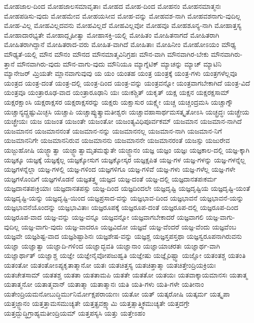 {ಮೋಹಜಾಲ-ದಿಂದ
ಮೋಹಜಾಲಸಮಾವೃತಾಃ
ಮೋಹದ
ಮೋಹ-ದಿಂದ
ಮೋಹನಂ
ಮೋಹನಮಾತ್ಮನಃ
ಮೋಹಪಡಿಸು-ವುದು
ಮೋಹಮೇವ
ಮೋಹಯಸೀವ
ಮೋಹ-ವನ್ನು
ಮೋಹವಶ-ನಾಗಿ
ಮೋಹವಶನಾಗು-ವುದಿಲ್ಲ
ಮೋಹ-ವಿಲ್ಲ
ಮೋಹವಿಲ್ಲದವನು
ಮೋಹವಿಲ್ಲದೆ
ಮೋಹವಿಲ್ಲವೋ
ಮೋಹವೂ
ಮೋಹಶೂನ್ಯ-ನಾಗಿ
ಮೋಹಾತ್ತಸ್ಯ
ಮೋಹಾದಾರಭ್ಯತೇ
ಮೋಹಾದ್ಗೃಹೀತ್ವಾ
ಮೋಹಾಸಕ್ತಿ-ಯಲ್ಲಿ
ಮೋಹಿತಂ
ಮೋಹಿತನಾಗದೆ
ಮೋಹಿತರಾಗಿ
ಮೋಹಿತರಾಗಿದ್ದಾನೆ
ಮೋಹಿತರಾದ-ವರು
ಮೋಹಿತ-ವಾಗಿದೆ
ಮೋಹಿತಾಃ
ಮೋಹಿನೀಂ
ಮೋಹೋಽಯಂ
ಮೌಢ್ಯ
ಮೌಢ್ಯತೆ-ಯಲ್ಲಿ
ಮೌನ
ಮೌನಂ
ಮೌನದ
ಮೌನಮಾತ್ಮವಿನಿಗ್ರಹಃ
ಮೌನ-ವಾಗಿ
ಮೌನವಾಗಿರ-ಬೇಕು
ಮೌನವಾಗಿರು-ತ್ತಾನೆ
ಮೌನವಾಗಿರು-ವುದು
ಮೌನ-ವಾಗು-ವುದು
ಮೌನಿಯೂ
ಮ್ಯಾಗ್ನೆಟಿಕ್
ಮ್ಯಾಚನ್ನು
ಮ್ಯಾಚ್
ಮ್ಯಾಟಿನಿ
ಮ್ಯಾನೇಜರ್
ಮ್ರಿಯತೇ
ಮ್ಲಾನವಾಗುವುವು
ಯ
ಯಂ
ಯಂತಹ
ಯಂತ್ರ
ಯಂತ್ರಕ್ಕೆ
ಯಂತ್ರ-ಗಳು
ಯಂತ್ರಗಳೆಲ್ಲವೂ
ಯಂತ್ರದ
ಯಂತ್ರ-ದಂತೆ
ಯಂತ್ರ-ದಲ್ಲಿ
ಯಂತ್ರ-ದಿಂದ
ಯಂತ್ರ-ವನ್ನು
ಯಂತ್ರವನ್ನೋ
ಯಂತ್ರವಾಗಬೇಕಾಗಿದೆ
ಯಂತ್ರ-ವಿದೆ
ಯಂತ್ರವೂ
ಯಂತ್ರಾರೂಢ-ವಾದ
ಯಂತ್ರಾರೂಢಾನಿ
ಯಃ
ಯಃಕಶ್ಚಿತ್
ಯಕೃತ್
ಯಕ್ಷ
ಯಕ್ಷನ
ಯಕ್ಷರಕ್ಷಸಾಮ್
ಯಕ್ಷರಕ್ಷಾಂಸಿ
ಯಕ್ಷರಾಕ್ಷಸರ
ಯಕ್ಷರಾಕ್ಷಸರನ್ನು
ಯಕ್ಷರು
ಯಕ್ಷಾಸುರ
ಯಕ್ಷ್ಯೇ
ಯಚ್ಚ
ಯಚ್ಚಂದ್ರಮಸಿ
ಯಚ್ಚಾಗ್ನೌ
ಯಚ್ಚಾನ್ಯದ್ದ್ರಷ್ಟುಮಿಚ್ಛಸಿ
ಯಚ್ಚಾಪಿ
ಯಚ್ಚಾಪ್ಯುತ್ಕ್ರಾಮತೀಶ್ವರಃ
ಯಚ್ಚಾವಹಾಸಾರ್ಥಮಸತ್ಕೃತೋಽಸಿ
ಯಚ್ಛ್ರದ್ಧಃ
ಯಚ್ಛ್ರೇಯ
ಯಚ್ಛ್ರೇಯಃ
ಯಜ
ಯಜಂತ
ಯಜಂತೇ
ಯಜಂತೋ
ಯಜಂತ್ಯವಿಧಿಪೂರ್ವಕಮ್
ಯಜಮಾನ
ಯಜಮಾನ-ನಾಗಿದೆ
ಯಜಮಾನನ
ಯಜಮಾನನಂತೆ
ಯಜಮಾನ-ನನ್ನು
ಯಜಮಾನನಲ್ಲ
ಯಜಮಾನ-ನಾಗಿ
ಯಜಮಾನ-ನಿಗೆ
ಯಜಮಾನನಿಗೇ
ಯಜಮಾನನಿರುವ
ಯಜಮಾನನು
ಯಜಮಾನನೇ
ಯಜಮಾನರಂತೆ
ಯಜಸ್ಸು
ಯಜುರೇವ
ಯಜ್ಜುಹೋಷಿ
ಯಜ್ಜ್ಞಾತ್ವಾ
ಯಜ್ಜ್ಞಾತ್ವಾಮೃತಮಶ್ನುತೇ
ಯಜ್ಜ್ಞಾನಂ
ಯಜ್ಞ
ಯಜ್ಞಂ
ಯಜ್ಞಃ
ಯಜ್ಞಕಾಲ-ದಲ್ಲಿ
ಯಜ್ಞ-ಕ್ಕಾಗಿ
ಯಜ್ಞಕ್ಕೂ
ಯಜ್ಞಕ್ಕೆ
ಯಜ್ಞಕ್ಕೆಲ್ಲ
ಯಜ್ಞಕ್ಕೋಸುಗ
ಯಜ್ಞಕ್ಕೋಸ್ಕರ
ಯಜ್ಞಕ್ಷಪಿತ
ಯಜ್ಞ-ಗಳ
ಯಜ್ಞ-ಗಳನ್ನು
ಯಜ್ಞ-ಗಳನ್ನೆಲ್ಲ
ಯಜ್ಞಗಳನ್ನೆಲ್ಲಾ
ಯಜ್ಞ-ಗಳಲ್ಲಿ
ಯಜ್ಞ-ಗಳಿಂದ
ಯಜ್ಞಗಳಿಗೂ
ಯಜ್ಞ-ಗಳಿವೆ
ಯಜ್ಞ-ಗಳು
ಯಜ್ಞ-ಗಳೆಲ್ಲ
ಯಜ್ಞ-ಗಳೇ
ಯಜ್ಞಗಳೊಂದಿಗೆ
ಯಜ್ಞಗಳೊಡನೆ
ಯಜ್ಞತತ್ತ್ವ
ಯಜ್ಞದ
ಯಜ್ಞ-ದಂತೆ
ಯಜ್ಞ-ದಲ್ಲಿ
ಯಜ್ಞದಾನತಪಃಕರ್ಮ
ಯಜ್ಞದಾನತಪಃಕ್ರಿಯಾಃ
ಯಜ್ಞದಾನತಪಸ್ಸು
ಯಜ್ಞ-ದಿಂದ
ಯಜ್ಞದಿಂದಲೇ
ಯಜ್ಞದೃಷ್ಟಿ
ಯಜ್ಞದೃಷ್ಟಿಯ
ಯಜ್ಞದೃಷ್ಟಿ-ಯಂತೆ
ಯಜ್ಞದೃಷ್ಟಿ-ಯನ್ನು
ಯಜ್ಞದೃಷ್ಟಿ-ಯಿಂದ
ಯಜ್ಞಪ್ರಸಾದ-ವನ್ನು
ಯಜ್ಞಭಾವ-ದಿಂದ
ಯಜ್ಞಭಾವನೆ
ಯಜ್ಞಭಾವನೆ-ಯನ್ನು
ಯಜ್ಞಭಾವನೆಯೊಂದನ್ನು
ಯಜ್ಞಭಾವಿತಾಃ
ಯಜ್ಞರೂಪಕ್ಕೆ
ಯಜ್ಞರೂಪ-ದಂತೆ
ಯಜ್ಞರೂಪ-ದಲ್ಲಿ
ಯಜ್ಞರೂಪ-ದಿಂದ
ಯಜ್ಞರೂಪ-ವಾದ
ಯಜ್ಞ-ವನ್ನು
ಯಜ್ಞ-ವನ್ನೂ
ಯಜ್ಞವನ್ನೋ
ಯಜ್ಞವಾಗಬೇಕಾದರೆ
ಯಜ್ಞವಾಗಲಿ
ಯಜ್ಞ-ವಾಗು-ವುದಿಲ್ಲ
ಯಜ್ಞ-ವಾಗು-ವುದು
ಯಜ್ಞ-ವಾದರೂ
ಯಜ್ಞವಿದೋ
ಯಜ್ಞವೆ
ಯಜ್ಞ-ವೆಂದರೆ
ಯಜ್ಞ-ವೆಂದು
ಯಜ್ಞವೆಂಬ
ಯಜ್ಞವೇ
ಯಜ್ಞಶಿಷ್ಟ-ವಾದ
ಯಜ್ಞಶಿಷ್ಟಾಶಿನಃ
ಯಜ್ಞಶೇಷ-ವನ್ನು
ಯಜ್ಞಶ್ಚ
ಯಜ್ಞಸ್ತಪಸ್ತಥಾ
ಯಜ್ಞಸ್ವರೂಪನಾಗಿರುವನು
ಯಜ್ಞಾ
ಯಜ್ಞಾತ್ವಾ
ಯಜ್ಞಾದಿ-ಗಳಿಂದ
ಯಜ್ಞಾದ್ಭವತಿ
ಯಜ್ಞಾನಾಂ
ಯಜ್ಞಾಯಾಚರತಃ
ಯಜ್ಞಾರ್ಥ-ವಾಗಿ
ಯಜ್ಞಾರ್ಥಾತ್
ಯಜ್ಞಾಶ್ಚ
ಯಜ್ಞೇ
ಯಜ್ಞೇನೈವೋಪಜುಹ್ವತಿ
ಯಜ್ಞೇಷು
ಯಜ್ಞೈರಿಷ್ಟ್ವಾ
ಯಜ್ಞೋ
ಯತಂತಶ್ಚ
ಯತಂತಿ
ಯತಂತೋ
ಯತಂತೋಽಪ್ಯಕೃತಾತ್ಮಾನೋ
ಯತಃ
ಯತಚಿತ್ತಸ್ಯ
ಯತಚಿತ್ತಾತ್ಮಾ
ಯತಚಿತ್ತೇಂದ್ರಿಯಕ್ರಿಯಃ
ಯತಚೇತಸಾಮ್
ಯತತಶ್ಚ
ಯತತಾ
ಯತತಾಮಪಿ
ಯತತೇ
ಯತತೋ
ಯತಯಃ
ಯತವಾಕ್ಕಾಯಮಾನಸಃ
ಯತಾತ್ಮ
ಯತಾತ್ಮನೋ
ಯತಾತ್ಮವಾನ್
ಯತಾತ್ಮಾ
ಯತಾತ್ಮಾನಃ
ಯತಿ
ಯತಿ-ಗಳು
ಯತಿ-ಗಳೇ
ಯತೀನಾಂ
ಯತೇಂದ್ರಿಯಮನೋಬುದ್ಧಿರ್ಮುನಿರ್ಮೋಕ್ಷಪರಾಯಣಃ
ಯತೋ
ಯತ್
ಯತ್ಕರೋಷಿ
ಯತ್ಕರ್ಮ
ಯತ್ಕೃಪಾ
ಯತ್ತಜ್ಜ್ಞಾನಂ
ಯತ್ತತ್ತಾಮಸಮುಚ್ಯತೇ
ಯತ್ತತ್ಪ್ರವಕ್ಷ್ಯಾಮಿ
ಯತ್ತತ್ಸಾತ್ತ್ವಿಕಮುಚ್ಯತೇ
ಯತ್ತದಗ್ರೇ
ಯತ್ತದ್ಬುದ್ಧಿಗ್ರಾಹ್ಯಮತೀಂದ್ರಿಯಮ್
ಯತ್ತಪಸ್ಯಸಿ
ಯತ್ತು
ಯತ್ತೇಽಹಂ
}
